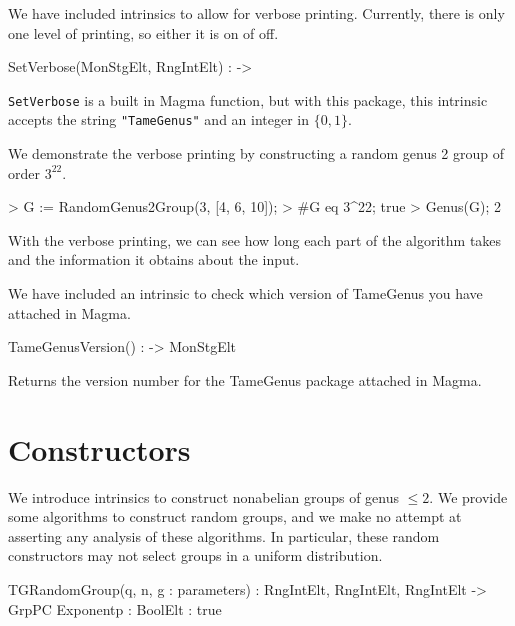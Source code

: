 \documentclass{documentation}
\begin{document}
We have included intrinsics to allow for verbose printing. 
Currently, there is only one level of printing, so either it is on of off. 

\begin{intrinsics}
SetVerbose(MonStgElt, RngIntElt) : -> 
\end{intrinsics}

{\tt SetVerbose} is a built in Magma function, but with this package, this intrinsic accepts the string {\tt "TameGenus"} and an integer in $\{0,1\}$. 

\begin{example}[VerbosePrinting]
  We demonstrate the verbose printing by constructing a random genus 2 group of order $3^{22}$.

\begin{code}
> G := RandomGenus2Group(3, [4, 6, 10]);
> #G eq 3^22;
true
> Genus(G);
2
\end{code}

With the verbose printing, we can see how long each part of the algorithm takes and the information it obtains about the input.
\begin{code}

\end{code}
\end{example}

We have included an intrinsic to check which version of TameGenus you have attached in Magma.

\begin{intrinsics}
TameGenusVersion() : -> MonStgElt
\end{intrinsics}

Returns the version number for the TameGenus package attached in Magma.


\chapter{Constructors}

We introduce intrinsics to construct nonabelian groups of genus $\leq 2$. 
We provide some algorithms to construct random groups, and we make no attempt at asserting any analysis of these algorithms.
In particular, these random constructors may not select groups in a uniform distribution. 

\begin{intrinsics}
TGRandomGroup(q, n, g : parameters) : RngIntElt, RngIntElt, RngIntElt -> GrpPC
    Exponentp : BoolElt : true
\end{intrinsics}
\end{document}
